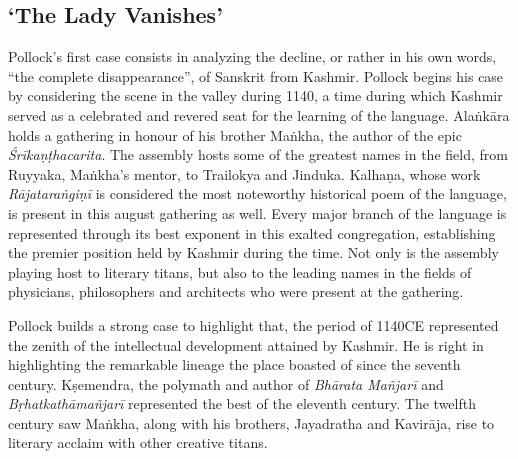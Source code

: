 \makeatletter
\renewcommand\thesubsection{\@arabic\c@subsection}
\makeatother
\subsection{‘The Lady Vanishes’}

Pollock’s first case consists in analyzing the decline, or rather in his own words, “the complete disappearance”, of Sanskrit from Kashmir. Pollock begins his case by considering the scene in the valley during 1140, a time during which Kashmir served as a celebrated and revered seat for the learning of the language. Alaṅkāra holds a gathering in honour of his brother Maṅkha, the author of the epic {\sl Śrīkaṇṭhacarita}. The assembly hosts some of the greatest names in the field, from Ruyyaka, Maṅkha’s mentor, to Trailokya and Jinduka. Kalhaṇa, whose work {\sl Rājataraṅgiṇī} is considered the most noteworthy historical poem of the language, is present in this august gathering as well. Every major branch of the language is represented through its best exponent in this exalted congregation, establishing the premier position held by Kashmir during the time. Not only is the assembly playing host to literary titans, but also to the leading names in the fields of physicians, philosophers and architects who were present at the gathering.

Pollock builds a strong case to highlight that, the period of 1140CE represented the zenith of the intellectual development attained by Kashmir. He is right in highlighting the remarkable lineage the place boasted of since the seventh century. Kṣemendra, the polymath and author of {\sl Bhārata Mañjarī} and {\sl Bṛhatkathāmañjarī} represented the best of the eleventh century. The twelfth century saw Maṅkha, along with his brothers, Jayadratha and Kavirāja, rise to literary acclaim with other creative titans.

